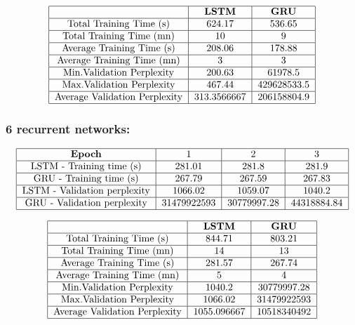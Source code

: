 \documentclass[11pt]{article}
\newcommand{\0}{\mat{0}}
\begin{document}
\begin{itemize}
\begin{enumerate}
	  \[
  	 	\begin{tabular}{| c | c | c |}
  	 	 	\hline
	 	 		& \textbf{LSTM} &  \textbf{GRU} \\
	  	 	\hline
	 			Total Training Time (s)		& 624.17 & 536.65 \\
	 	 	\hline
				Total Training Time (mn)		& 10 & 9 \\
			\hline 
				Average Training Time (s)	 	& 208.06 & 178.88 \\
			\hline 
				Average Training Time (mn)	& 3 & 3 \\
			\hline
				Min.Validation Perplexity		& 200.63 & 61978.5 \\
			\hline
				Max.Validation Perplexity		& 467.44 & 429628533.5 \\
			\hline
				Average Validation Perplexity	& 313.3566667 & 206158804.9 \\
			\hline
		\end{tabular}
	\] 
	
	\subsubsection*{\textbf{6 recurrent networks:}}
	  \[
  	 	\begin{tabular}{| c | c | c | c |}
  	 	 	\hline
	 	 		\textbf{Epoch} & 1 & 2 & 3  \\
	  	 	\hline
	 			LSTM - Training time (s)		& 281.01 & 281.8 & 281.9 \\
	 	 	\hline
				GRU - Training time (s)		& 267.79 & 267.59 & 267.83 \\
			\hline 
				LSTM - Validation perplexity	& 1066.02	 & 1059.07 & 1040.2 \\
			\hline 
				GRU - Validation perplexity	& 31479922593 & 30779997.28 & 44318884.84 \\
			\hline
		\end{tabular}
	\] 

	  \[
  	 	\begin{tabular}{| c | c | c |}
  	 	 	\hline
	 	 		& \textbf{LSTM} &  \textbf{GRU} \\
	  	 	\hline
	 			Total Training Time (s)		& 844.71 & 803.21\\
	 	 	\hline
				Total Training Time (mn)		& 14 & 13 \\
			\hline 
				Average Training Time (s)	 	& 281.57 & 267.74 \\
			\hline 
				Average Training Time (mn)	& 5 & 4 \\
			\hline
				Min.Validation Perplexity		& 1040.2 & 30779997.28 \\
			\hline
				Max.Validation Perplexity		& 1066.02	 & 31479922593\\
			\hline
				Average Validation Perplexity	& 1055.096667 & 10518340492\\
			\hline
		\end{tabular}
	\] 



\end{enumerate}
\end{itemize}
\end{document}
